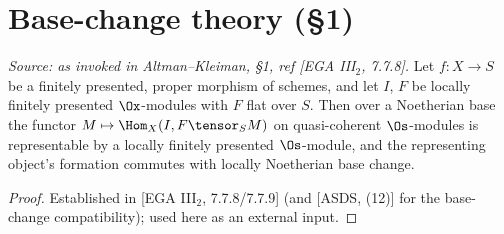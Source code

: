 
\chapter{Base-change theory (\S1)}



\begin{theorem}
  \label{thm:ega_H_existence}
  \textit{Source: as invoked in Altman--Kleiman, §1, ref [EGA III$_2$, 7.7.8].}
  Let $f : X \to S$ be a finitely presented, proper morphism of schemes, and let
  $I$, $F$ be locally finitely presented $\Ox$-modules with $F$ flat over $S$.
  Then over a Noetherian base the functor $M \mapsto \Hom_X(I, F \tensor_S M)$ on
  quasi-coherent $\Os$-modules is representable by a locally finitely presented
  $\Os$-module, and the representing object's formation commutes with locally
  Noetherian base change.
  \begin{proof}
    Established in [EGA III$_2$, 7.7.8/7.7.9] (and [ASDS, (12)] for the
    base-change compatibility); used here as an external input.
  \end{proof}
\end{theorem}

